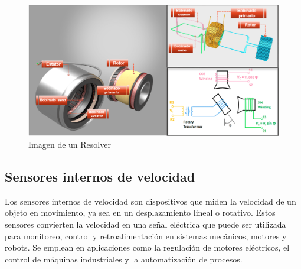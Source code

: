 \begin{itemize}
\begin{figure}[h]
	\centering
	\includegraphics[width=10 cm]{img/Resolver}
	\caption{Imagen de un Resolver}
	\label{fig:Resolver}
\end{figure}
\end{itemize}

\subsection{Sensores internos de velocidad}
Los sensores internos de velocidad son dispositivos que miden la velocidad de un objeto en movimiento, ya sea en un desplazamiento lineal o rotativo. Estos sensores convierten la velocidad en una señal eléctrica que puede ser utilizada para monitoreo, control y retroalimentación en sistemas mecánicos, motores y robots. Se emplean en aplicaciones como la regulación de motores eléctricos, el control de máquinas industriales y la automatización de procesos.



